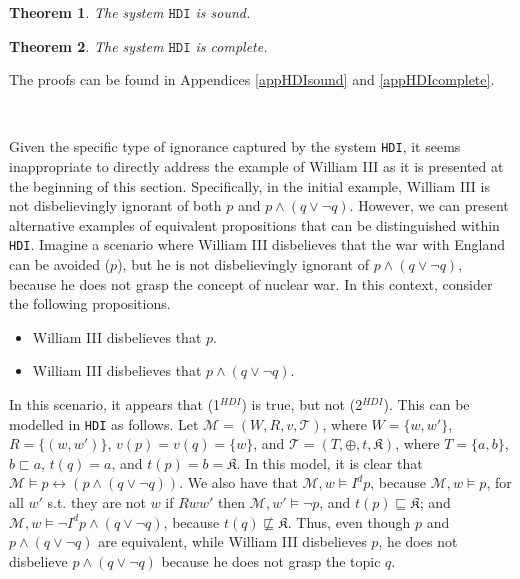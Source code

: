 \documentclass{article}
\newtheorem{theor}{Theorem}
\begin{document}
\begin{theor}

The system $\mathtt{HDI}$ is sound.

\end{theor}

\begin{theor}

The system $\mathtt{HDI}$ is complete.

\end{theor}

The proofs can be found in Appendices \ref{appHDIsound} and \ref{appHDIcomplete}.

\

Given the specific type of ignorance captured by the system \texttt{HDI}, it seems inappropriate to directly address the example of William III as it is presented at the beginning of this section. Specifically, in the initial example, William III is not disbelievingly ignorant of both $p$ and $p \wedge (q \vee \neg q)$. However, we can present alternative examples of equivalent propositions that can be distinguished within \texttt{HDI}. Imagine a scenario where William III disbelieves that the war with England can be avoided ($p$), but he is not disbelievingly ignorant of $p \wedge (q \vee \neg q)$, because he does not grasp the concept of nuclear war. In this context, consider the following propositions.

\begin{itemize}

\item[(1$^{HDI}$)] William III disbelieves that $p$.

\item[(2$^{HDI}$)] William III disbelieves that $p \wedge (q \vee \neg q)$.

\end{itemize}

In this scenario, it appears that (1$^{HDI}$) is true, but not (2$^{HDI}$). This can be modelled in \texttt{HDI} as follows. Let $\mathcal{M} = (W, R, v, \mathcal{T})$, where $W = \{w, w'\}$, $R = \{(w,w')\}$, $v(p) = v(q) = \{w\}$, and $\mathcal{T} = (T, \oplus, t, \mathfrak{K})$, where $T =\{a, b\}$, $b \sqsubset a$, $t(q) = a$, and $t(p) = b = \mathfrak{K}$. In this model, it is clear that $\mathcal{M} \models p \leftrightarrow (p \wedge (q \vee \neg q))$. We also have that $\mathcal{M}, w \models I^{d} p$, because $\mathcal{M}, w \models p$, for all $w'$ s.t. they are not $w$ if $Rww'$ then $\mathcal{M}, w' \models \neg p$, and $t(p) \sqsubseteq \mathfrak{K}$; and $\mathcal{M}, w \models \neg I^{d} p \wedge (q \vee \neg q)$, because $t(q) \not \sqsubseteq \mathfrak{K}$. Thus, even though $p$ and $p \wedge (q \vee \neg q)$ are equivalent, while William III disbelieves $p$, he does not disbelieve $p \wedge (q \vee \neg q)$ because he does not grasp the topic $q$.
\end{document}
